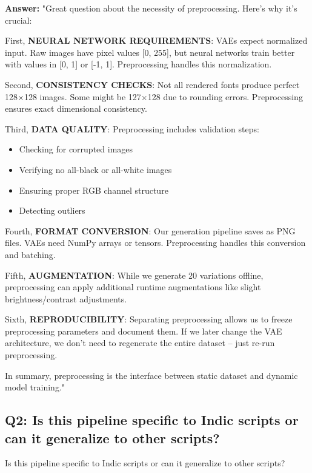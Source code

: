 \documentclass[11pt,a4paper]{article}
\begin{document}
\begin{answerbox}
\textbf{Answer:} "Great question about the necessity of preprocessing. Here's why it's crucial:

First, \textbf{NEURAL NETWORK REQUIREMENTS}: VAEs expect normalized input. Raw images have pixel values [0, 255], but neural networks train better with values in [0, 1] or [-1, 1]. Preprocessing handles this normalization.

Second, \textbf{CONSISTENCY CHECKS}: Not all rendered fonts produce perfect 128×128 images. Some might be 127×128 due to rounding errors. Preprocessing ensures exact dimensional consistency.

Third, \textbf{DATA QUALITY}: Preprocessing includes validation steps:
\begin{itemize}
\item Checking for corrupted images
\item Verifying no all-black or all-white images
\item Ensuring proper RGB channel structure
\item Detecting outliers
\end{itemize}

Fourth, \textbf{FORMAT CONVERSION}: Our generation pipeline saves as PNG files. VAEs need NumPy arrays or tensors. Preprocessing handles this conversion and batching.

Fifth, \textbf{AUGMENTATION}: While we generate 20 variations offline, preprocessing can apply additional runtime augmentations like slight brightness/contrast adjustments.

Sixth, \textbf{REPRODUCIBILITY}: Separating preprocessing allows us to freeze preprocessing parameters and document them. If we later change the VAE architecture, we don't need to regenerate the entire dataset -- just re-run preprocessing.

In summary, preprocessing is the interface between static dataset and dynamic model training."
\end{answerbox}

\subsection{Q2: Is this pipeline specific to Indic scripts or can it generalize to other scripts?}

\begin{qbox}[title=Question]
Is this pipeline specific to Indic scripts or can it generalize to other scripts?
\end{qbox}
\end{document}
